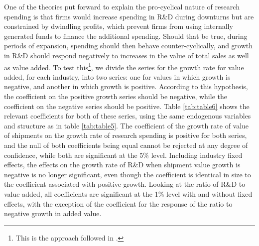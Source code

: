 \documentclass{_latex/house}
\begin{document}
One of the theories put forward to explain the pro-cyclical nature of research spending is that firms would increase spending in R\&D during downturns but are constrained by dwindling profits, which prevent firms from using internally generated funds to finance the additional spending. Should that be true, during periods of expansion, spending should then behave counter-cyclically, and growth in R\&D should respond negatively to increases in the value of total sales as well as value added. To test this\footnote{This is the approach followed in \cite{RePEc:tpr:restat:v:93:y:2011:i:2:p:542-553}.}, we divide the series for the growth rate for value added, for each industry, into two series: one for values in which growth is negative, and another in which growth is positive. According to this hypothesis, the coefficient on the positive growth series should be negative, while the coefficient on the negative series should be positive. Table \ref{tab:table6} shows the relevant coefficients for both of these series, using the same endogenous variables and structure as in table \ref{tab:table5}. The coefficient of the growth rate of value of shipments on the growth rate of research spending is positive for both series, and the null of both coefficients being equal cannot be rejected at any degree of confidence, while both are significant at the 5\% level. Including industry fixed effects, the effects on the growth rate of R\&D when shipment value growth is negative is no longer significant, even though the coefficient is identical in size to the coefficient associated with positive growth. Looking at the ratio of R\&D to value added, all coefficients are significant at the 1\% level with and without fixed effects, with the exception of the coefficient for the response of the ratio to negative growth in added value.
\end{document}
